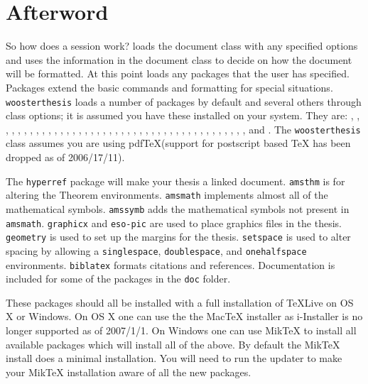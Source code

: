 \chapter*{Afterword}\label{after}
So how does a \lt session work? \lt loads the document class with any specified options and uses the information in the document class to decide on how the document will be formatted. At this point \lt loads any packages that the user has specified. Packages extend the basic \lt commands and formatting for special situations. \verb|woosterthesis| loads a number of packages by default and several others through class options; it is assumed you have these installed on your system. They are:
,
,
,
,
,
,
,
,
,
,
,
,
,
,
,
,
,
,
,
,
,
,
,
,
,
,
,
,
,
,
,
,
,
,
,
,
,
,
,
,
,
,
and .
The \texttt{woosterthesis} class assumes you are using pdf\TeX (support for postscript based TeX has been dropped as of 2006/17/11).

The \texttt{hyperref} package will make your thesis a linked document. \texttt{amsthm} is for altering the Theorem environments. \texttt{amsmath} implements almost all of the mathematical symbols. \texttt{amssymb} adds the mathematical symbols not present in \texttt{amsmath}. \texttt{graphicx} and \texttt{eso-pic} are used to place graphics files in the thesis. \texttt{geometry} is used to set up the margins for the thesis. \texttt{setspace} is used to alter spacing by allowing a \texttt{singlespace}, \texttt{doublespace}, and \texttt{onehalfspace} environments. \texttt{biblatex} formats citations and references.  Documentation is included for some of the packages in the \verb|doc| folder.

These packages should all be installed with a full installation of TeXLive on OS X or Windows. On OS X one can use the the MacTeX installer as i-Installer is no longer supported as of 2007/1/1. On Windows one can use MikTeX to install all available packages which will install all of the above. By default the MikTeX install does a minimal installation. You will need to run the updater to make your MikTeX installation aware of all the new packages.

